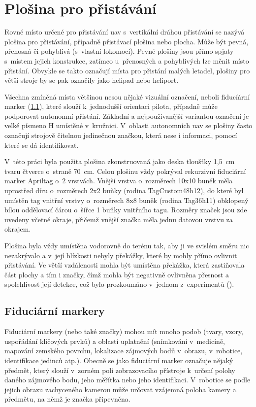 \chapter{Plošina pro přistávání} \label{chap:pad}
  Rovné místo určené pro přistávání \acrshort{uav} s~vertikální dráhou přistávání se nazývá plošina pro přistávání, případně přistávací plošina nebo plocha. Může být pevná, přenosná či pohyblivá (s~vlastní lokomocí). Pevné plošiny jsou přímo spjaty s~místem jejich konstrukce, zatímco u~přenosných a pohyblivých lze měnit místo přistání. Obvykle se takto označují místa pro přistání malých letadel, plošiny pro větší stroje by se pak označily jako helipad nebo heliport.

  Všechna zmíněná místa většinou nesou nějaké vizuální označení, neboli fiducíární marker (\cref{sec:fidu}), které slouží k~jednodušší orientaci pilota, případně může podporovat autonomní přistání. Základní a nejpoužívanější variantou označení je velké písmeno H umístěné v~kružnici. V~oblasti autonomních \acrshort{uav} se plošiny často označují strojově čitelnou jedinečnou značkou, která nese i informaci, pomocí které se dá identifikovat.

  V~této práci byla použita plošina zkonstruovaná jako deska tloušťky 1{,}5~cm tvaru čtverce o~straně 70~cm. Celou plošinu vždy pokrýval rekurzivní fiduciární marker Apriltag o~2 vrstvách. Vnější vrstva o~rozměrech 10x10 buněk měla uprostřed díru o~rozměrech 2x2 buňky (rodina TagCustom48h12), do které byl umístěn tag vnitřní vrstvy o~rozměrech 8x8 buněk (rodina Tag36h11) obklopený bílou oddělovací čárou o~šířce 1 buňky vnitřního tagu. Rozměry značek jsou zde uvedeny včetně okraje, přičemž vnější značka měla jednu datovou vrstvu za okrajem.
  
  Plošina byla vždy umístěna vodorovně do terénu tak, aby ji ve svislém směru nic nezakrývalo a v~její blízkosti nebyly překážky, které by mohly přímo ovlivnit přistávání. Ve větší vzdálenosti mohla být umístěna překážka, která zastiňovala část plochy a tím i značky, čímž mohla být negativně ovlivněna přesnost a spolehlivost její detekce, což bylo prozkoumáno v~jednom z~experimentů ().
  \section{Fiduciární markery} \label{sec:fidu} %
    Fiduciární markery (nebo také značky) mohou mít mnoho podob (tvary, vzory, uspořádání klíčových prvků) a oblastí uplatnění (snímkování v~medicíně, mapování zemského povrchu, lokalizace zájmových bodů v~obrazu, v~robotice, identifikace jedinců atp.). Obecně se jako fiduciární marker označuje nějaký předmět, který slouží v~zorném poli zobrazovacího přístroje k~určení polohy daného zájmového bodu, jeho měřítka nebo jeho identifikaci. V~robotice se podle jejich obrazu zachyceného kamerou může určovat vzájemná poloha kamery a předmětu, na němž je značka připevněna.~\cite{kostak:fidmark}
    
